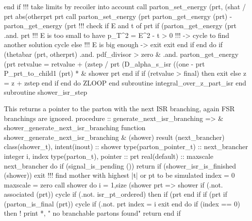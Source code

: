               end if
              !!! take limits by recoiler into account
              call parton_set_energy (prt, (shat / prt%
                   abs(otherprt%
                   prt%
              call parton_set_energy (prt%
                   parton_get_energy (prt) - parton_get_energy (prt%
              !!! check if E and t of prt%
              if (parton_get_energy (prt%
                   .and. prt%
                 !!! E is too small to have p_T^2 = E^2 - t > 0
                 !!!      -> cycle to find another solution
                 cycle
              else
                 !!! E is big enough -> exit
                 exit
              end if
           end do
           if (thetabar (prt, otherprt) .and. pdf_divisor > zero &
                .and. parton_get_energy (prt%
              retvalue = retvalue + (zstep / prt%
                   (D_alpha_s_isr ((one - prt%
                   P_prt_to_child1 (prt) * &
                   shower%
                   prt%
           end if
           if (retvalue > final) then
              exit
           else
              z = z + zstep
           end if
        end do ZLOOP
      end subroutine integral_over_z_part_isr
    end subroutine shower_isr_step

\eatline
\nwendcode{}This returns a pointer to the parton with the next ISR branching, again
FSR branchings are ignored.
\nwenddocs{}\plusendmoddef
  procedure :: generate_next_isr_branching => &
       shower_generate_next_isr_branching
\nwendcode{}\plusendmoddef
  function shower_generate_next_isr_branching &
       (shower) result (next_brancher)
    class(shower_t), intent(inout) :: shower
    type(parton_pointer_t) :: next_brancher
    integer i, index
    type(parton_t),  pointer :: prt
    real(default) :: maxscale
    next_brancher%
    do
       if (signal_is_pending ()) return
       if (shower_isr_is_finished (shower)) exit
       !!! find mother with highest |t| or pt to be simulated
       index = 0
       maxscale = zero
       call shower%
       do i = 1,size (shower%
          prt => shower%
          if (.not. associated (prt)) cycle
          if (.not. isr_pt_ordered) then
             if (prt%
          end if
          if (prt%
          if (parton_is_final (prt)) cycle
          if (.not. prt%
          index = i
          exit
       end do
       if (index == 0) then
          ! print *, " no branchable partons found"
          return
       end if

